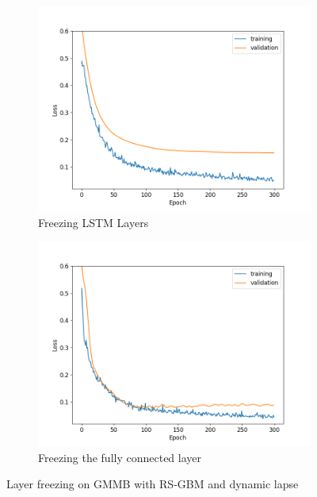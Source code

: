 \begin{figure}[ht!]
    \centering
    \begin{subfigure}{0.48\textwidth}
        \includegraphics[width=\textwidth]{./project3/figures/figure3a.png}
        \caption{Freezing LSTM Layers} 
        \label{subfig3-3:freezeLSTM}
    \end{subfigure}\hfill
    \begin{subfigure}{0.48\textwidth}
        \includegraphics[width=\textwidth]{./project3/figures/figure3b.png}
        \caption{Freezing the fully connected layer}
        \label{subfig3-3:freezeFC}
    \end{subfigure}
    \caption{Layer freezing on GMMB with RS-GBM and dynamic lapse}
    \label{fig3:figure3}
\end{figure}

